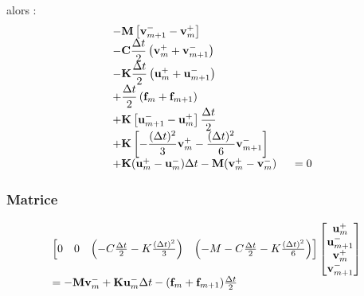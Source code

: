 \documentclass[12pt,a4paper]{report}
\begin{document}
alors :
\begin{equation}
\begin{array}{r l}
	&\displaystyle
	 -\mathbf{M}
	    	\left[ \mathbf{v}_{m+1}^- 
	    		- \mathbf{v}_m^+ \right]
	\\ 
	  &\displaystyle
	  -\mathbf{C} \frac{\Delta t}{2}
		\left(
			\mathbf{v}_m^+ + 
			\mathbf{v}_{m+1}^- 
		\right)
	\\
	  &\displaystyle
	 -\mathbf{K} \frac{\Delta t}{2}
		\left(
			\mathbf{u}_m^+ + 
			\mathbf{u}_{m+1}^- 
		\right)
	\\
	  &\displaystyle
	   +\frac{\Delta t}{2}
		\left(
			\mathbf{f}_m + 
			\mathbf{f}_{m+1}
		\right) 
	\\
	  &+\displaystyle
	    \mathbf{K}
	    	\left[ \mathbf{u}_{m+1}^- 
	    		- \mathbf{u}_m^+ \right]		
			\frac{\Delta t}{2}
	\\
	&\displaystyle	    
	    +\mathbf{K}
		\left[ 
			-\frac{(\Delta t)^2}{3} \mathbf{v}_m^+  
			-\frac{(\Delta t)^2}{6} \mathbf{v}_{m+1}^-
		\right]
	\\
	  &+ \mathbf{K} (\mathbf{u}_m^+ - \mathbf{u}_m^-) \Delta t
	   - \mathbf{M} (\mathbf{v}_m^+ - \mathbf{v}_m^-)
	~~~~=0	
\end{array}
\end{equation}

\subsubsection{Matrice}
\begin{equation}
\begin{array}{l l}
		\begin{bmatrix}	   
		   0
		   &0
		   & \left( - C \frac{\Delta t}{2}
		    		- K \frac{(\Delta t)^2}{3}
		     \right)
		   & \left(	- M
		    		- C \frac{\Delta t}{2}
		    		- K \frac{(\Delta t)^2}{6} 
		     \right)\\ 
		\end{bmatrix}
		\begin{bmatrix}
		   \mathbf{u}_m^+  		\\
		   \mathbf{u}_{m+1}^-  	\\
		   \mathbf{v}_m^+  		\\
		   \mathbf{v}_{m+1}^-  	\\
		\end{bmatrix}
	\\
		= - \mathbf{M} \mathbf{v}_m^-
		  + \mathbf{K} \mathbf{u}_m^- \Delta t
		  - (\mathbf{f}_m + \mathbf{f}_{m+1})  \frac{\Delta t}{2}
	
\end{array}
\end{equation}
\end{document}
